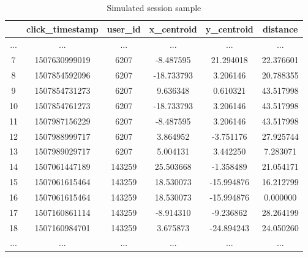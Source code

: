 \documentclass[ecp,tc,english]{iiufrgs}
\begin{document}
        \begin{table}[!ht]
            \centering
            \begin{tabular}{ |c|c|c|c|c|c| } 
                \hline
                \  & click\_timestamp & user\_id & x\_centroid & y\_centroid & distance \\
                \hline 
                 ... & ... & ... & ... & ... & ... \\
                 7 & 1507630999019 & 6207 & -8.487595 & 21.294018 & 22.376601 \\
                 8 & 1507854592096 & 6207 & -18.733793 & 3.206146 & 20.788355 \\
                 9 & 1507854731273 & 6207 & 9.636348 & 0.610321 & 43.517998 \\
                 10 & 1507854761273 & 6207 & -18.733793 & 3.206146 & 43.517998 \\
                 11 & 1507987156229 & 6207 & -8.487595 & 3.206146 & 43.517998 \\
                 12 & 1507988999717 & 6207 & 3.864952 & -3.751176 & 27.925744 \\
                 13 & 1507989029717 & 6207 & 5.004131 & 3.442250 & 7.283071 \\
                 \rowcolor[RGB]{220,220,220}
                 14 & 1507061447189 & 143259 & 25.503668 & -1.358489 & 21.054171 \\
                 15 & 1507061615464 & 143259 & 18.530073 & -15.994876 & 16.212799 \\
                 16 & 1507061615464 & 143259 & 18.530073 & -15.994876 & 0.000000 \\
                 17 & 1507160861114 & 143259 & -8.914310 & -9.236862 & 28.264199 \\
                 18 & 1507160984701 & 143259 & 3.675873 & -24.894243 & 24.050260 \\
                 ... & ... & ... & ... & ... & ... \\
                \hline
            \end{tabular}
            \caption{Simulated session sample}
            \label{tab:session_simulation}
        \end{table}
        
\end{document}
